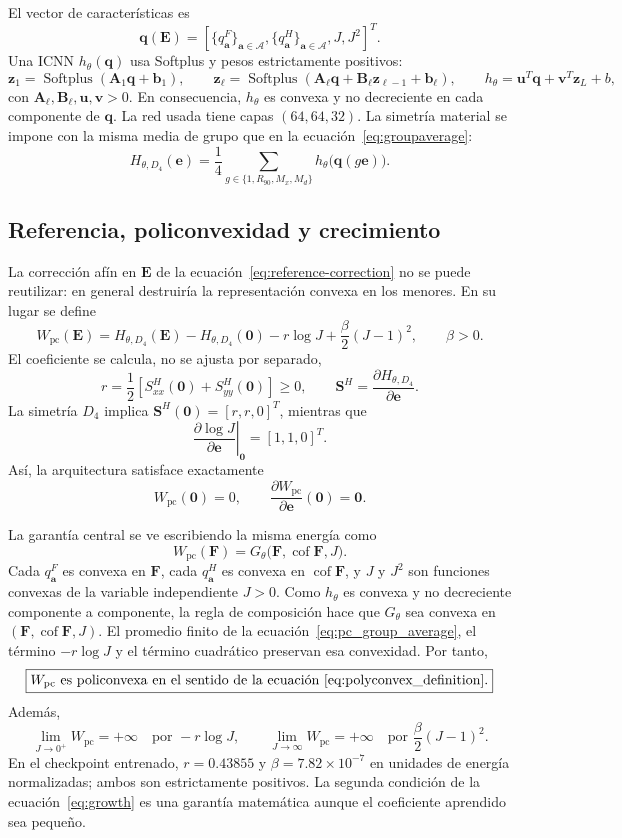 \documentclass[11pt,a4paper]{article}
\newcommand{\E}{\ensuremath{\bm E}}
\newcommand{\F}{\ensuremath{\bm F}}
\newcommand{\Svec}{\ensuremath{\bm S}}
\newcommand{\evec}{\ensuremath{\bm e}}
\newcommand{\Dfour}{\ensuremath{D_4}}
\begin{document}
El vector de características es
\[
 \bm q(\E)=
 \left[\{q^F_{\bm a}\}_{\bm a\in\mathcal A},
       \{q^H_{\bm a}\}_{\bm a\in\mathcal A},J,J^2\right]^T.
\]
Una ICNN \(h_\theta(\bm q)\) usa Softplus y pesos estrictamente positivos:
\[
 \bm z_1=\operatorname{Softplus}(\bm A_1\bm q+\bm b_1),
 \qquad
 \bm z_{\ell}=\operatorname{Softplus}
 (\bm A_\ell\bm q+\bm B_\ell\bm z_{\ell-1}+\bm b_\ell),
 \qquad
 h_\theta=\bm u^T\bm q+\bm v^T\bm z_L+b,
 \label{eq:monotone_icnn}
\]
con \(\bm A_\ell,\bm B_\ell,\bm u,\bm v>0\). En consecuencia,
\(h_\theta\) es convexa y no decreciente en cada componente de \(\bm q\).
La red usada tiene capas \((64,64,32)\). La simetría material se impone con
la misma media de grupo que en la ecuación~\eqref{eq:groupaverage}:
\[
 H_{\theta,\Dfour}(\evec)=
 \frac14\sum_{g\in\{1,R_{90},M_x,M_d\}}
 h_\theta\bigl(\bm q(g\evec)\bigr).
 \label{eq:pc_group_average}
\]

\subsection{Referencia, policonvexidad y crecimiento}

La corrección afín en \(\E\) de la ecuación~\eqref{eq:reference-correction}
no se puede reutilizar: en general destruiría la representación convexa en
los menores. En su lugar se define
\[
 \boxed{
 W_{\mathrm{pc}}(\E)=H_{\theta,\Dfour}(\E)-H_{\theta,\Dfour}(\bm0)
 -r\log J+\frac{\beta}{2}(J-1)^2,\qquad \beta>0.}
 \label{eq:pc_energy}
\]
El coeficiente se calcula, no se ajusta por separado,
\[
 r=\frac12\left[S^H_{xx}(\bm0)+S^H_{yy}(\bm0)\right]\ge0,
 \qquad \Svec^H=\frac{\partial H_{\theta,\Dfour}}{\partial\evec}.
 \label{eq:pc_reference_pressure}
\]
La simetría \(\Dfour\) implica \(\Svec^H(\bm0)=[r,r,0]^T\), mientras que
\[
 \left.\frac{\partial\log J}{\partial\evec}\right|_{\bm0}=[1,1,0]^T.
\]
Así, la arquitectura satisface exactamente
\[
 W_{\mathrm{pc}}(\bm0)=0,
 \qquad \frac{\partial W_{\mathrm{pc}}}{\partial\evec}(\bm0)=\bm0.
\]

La garantía central se ve escribiendo la misma energía como
\[
 W_{\mathrm{pc}}(\F)=G_\theta\bigl(\F,\operatorname{cof}\F,J\bigr).
\]
Cada \(q^F_{\bm a}\) es convexa en \(\F\), cada \(q^H_{\bm a}\) es
convexa en \(\operatorname{cof}\F\), y \(J\) y \(J^2\) son funciones
convexas de la variable independiente \(J>0\). Como \(h_\theta\) es
convexa y no decreciente componente a componente, la regla de composición
hace que \(G_\theta\) sea convexa en \((\F,\operatorname{cof}\F,J)\).
El promedio finito de la ecuación~\eqref{eq:pc_group_average}, el término
\(-r\log J\) y el término cuadrático preservan esa convexidad. Por tanto,
\[
 \boxed{W_{\mathrm{pc}}\ \text{es policonvexa en el sentido de
la ecuación~\eqref{eq:polyconvex_definition}.}}
\]
Además,
\[
 \lim_{J\to0^+}W_{\mathrm{pc}}=+\infty
 \quad\text{por }-r\log J,
 \qquad
 \lim_{J\to\infty}W_{\mathrm{pc}}=+\infty
 \quad\text{por }\frac{\beta}{2}(J-1)^2.
 \label{eq:growth}
\]
En el checkpoint entrenado, \(r=0.43855\) y
\(\beta=7.82\times10^{-7}\) en unidades de energía normalizadas; ambos son
estrictamente positivos. La segunda condición de la ecuación~\eqref{eq:growth}
es una garantía matemática aunque el coeficiente aprendido sea pequeño.
\end{document}
